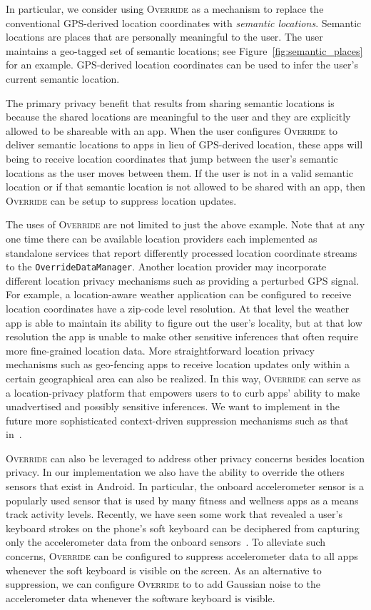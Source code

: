 \documentclass[10pt]{sensys-proc}
\begin{document}
In particular, we consider using \textsc{Override} as a mechanism to replace the conventional GPS-derived location coordinates with \emph{semantic locations}. Semantic locations are places that are personally meaningful to the user. The user maintains a geo-tagged set of semantic locations; see Figure~\ref{fig:semantic_places} for an example. GPS-derived location coordinates can be used to infer the user's current semantic location.

The primary privacy benefit that results from sharing semantic locations is because the shared locations are meaningful to the user and they are explicitly allowed to be shareable with an app. When the user configures \textsc{Override} to deliver semantic locations to apps in lieu of GPS-derived location, these apps will being to receive location coordinates that jump between the user's semantic locations as the user moves between them. If the user is not in a valid semantic location or if that semantic location is not allowed to be shared with an app, then \textsc{Override} can be setup to suppress location updates.

The uses of \textsc{Override} are not limited to just the above example. Note that at any one time there can be available location providers each implemented as standalone services that report differently processed location coordinate streams to the \texttt{OverrideDataManager}. Another location provider may incorporate different location privacy mechanisms such as providing a perturbed GPS signal. For example, a location-aware weather application can be configured to receive location coordinates have a zip-code level resolution. At that level the weather app is able to maintain its ability to figure out the user's locality, but at that low resolution the app is unable to make other sensitive inferences that often require more fine-grained location data. More straightforward location privacy mechanisms such as geo-fencing apps to receive location updates only within a certain geographical area can also be realized. In this way, \textsc{Override} can serve as a location-privacy platform that empowers users to to curb apps' ability to make unadvertised and possibly sensitive inferences. We want to implement in the future more sophisticated context-driven suppression mechanisms such as that in~\cite{Gotz:MaskIt}.

\textsc{Override} can also be leveraged to address other privacy concerns besides location privacy. In our implementation we also have the ability to override the others sensors that exist in Android. In particular, the onboard accelerometer sensor is a popularly used sensor that is used by many fitness and wellness apps as a means track activity levels. Recently, we have seen some work that revealed a user's keyboard strokes on the phone's soft keyboard can be deciphered from capturing only the accelerometer data from the onboard sensors~\cite{}. To alleviate such concerns, \textsc{Override} can be configured to suppress accelerometer data to all apps whenever the soft keyboard is visible on the screen. As an alternative to suppression, we can configure \textsc{Override} to to add Gaussian noise to the accelerometer data whenever the software keyboard is visible.
\end{document}
